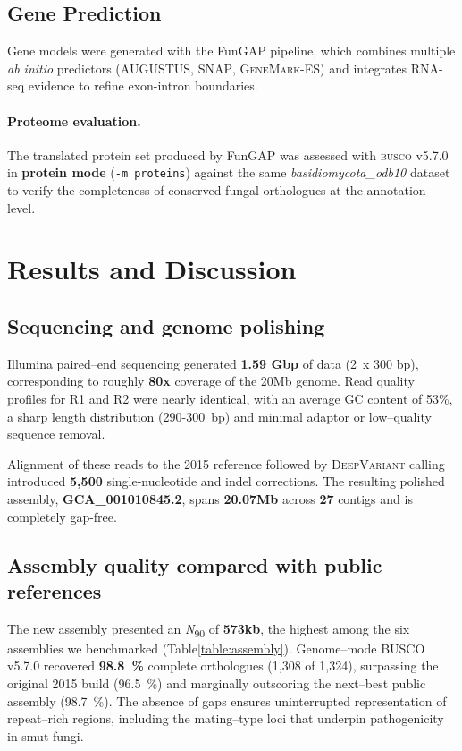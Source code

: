 \documentclass[Journal,letterpaper]{ascelike-new}
\begin{document}
\subsection*{Gene Prediction}

Gene models were generated with the FunGAP pipeline, which combines multiple \textit{ab initio} predictors (\textsc{AUGUSTUS}, \textsc{SNAP}, \textsc{GeneMark-ES}) and integrates RNA-seq evidence to refine exon-intron boundaries.

\paragraph{Proteome evaluation.} The translated protein set produced by FunGAP was assessed with \textsc{busco} v5.7.0 in \textbf{protein mode} (\texttt{-m proteins}) against the same \textit{basidiomycota\_odb10} dataset to verify the completeness of conserved fungal orthologues at the annotation level.


 \section*{Results and Discussion}

 \subsection*{Sequencing and genome polishing}

Illumina paired--end sequencing generated \textbf{1.59 Gbp} of data (2~x 300 bp), corresponding to roughly \textbf{80x} coverage of the 20Mb genome. Read quality profiles for R1 and R2 were nearly identical, with an average GC content of 53\%, a sharp length distribution (290-300~bp) and minimal adaptor or low--quality sequence removal.

Alignment of these reads to the 2015 reference followed by \textsc{DeepVariant} calling introduced \textbf{5,500} single-nucleotide and indel corrections. The resulting polished assembly, \textbf{GCA\_001010845.2}, spans \textbf{20.07Mb} across \textbf{27} contigs and is completely gap-free.

\subsection*{Assembly quality compared with public references}

The new assembly presented an \textit{N}\textsubscript{90} of \textbf{573kb}, the highest among the six assemblies we benchmarked (Table\ref{table:assembly}). Genome--mode BUSCO v5.7.0 recovered \textbf{98.8~\%} complete orthologues (1,308 of 1,324), surpassing the original 2015 build (96.5~\%) and marginally outscoring the next--best public assembly (98.7~\%). The absence of gaps ensures uninterrupted representation of repeat--rich regions, including the mating--type loci that underpin pathogenicity in smut fungi.
\end{document}
